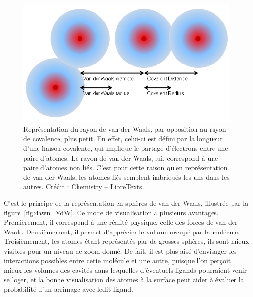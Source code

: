 	\begin{figure}[H]
		\centering
		\includegraphics[width=\textwidth]{figures/ch1/vdwradius}
		\caption{Représentation du rayon de van der Waals, par opposition au rayon de covalence, plus petit. En effet, celui-ci est défini par la longueur d'une liaison covalente, qui implique le partage d'électrons entre une paire d'atomes. Le rayon de van der Waals, lui, correspond à une paire d'atomes non liés. C'est pour cette raison qu'en représentation de van der Waals, les atomes liés semblent imbriqués les uns dans les autres. Crédit : Chemistry -- LibreTexts\protect\footnotemark.}
		\label{fig:vdwradius}
	\end{figure}
	
    
	C'est le principe de la représentation en sphères de van der Waals, illustrée par la figure~\ref{fig:4awn_VdW}. Ce mode de visualisation a plusieurs avantages. Premièrement, il correspond à une réalité physique, celle des forces de van der Waals. Deuxièmement, il permet d'apprécier le volume occupé par la molécule. Troisièmement, les atomes étant représentés par de grosses sphères, ils sont mieux visibles pour un niveau de zoom donné. De fait, il est plus aisé d'envisager les interactions possibles entre cette molécule et une autre, puisque l'on perçoit mieux les volumes des cavités dans lesquelles d'éventuels ligands pourraient venir se loger, et la bonne visualisation des atomes à la surface peut aider à évaluer la probabilité d'un arrimage avec ledit ligand.
		
